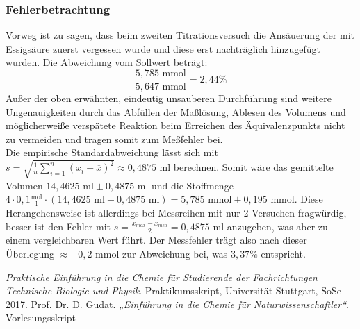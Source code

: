 \documentclass{scrartcl}
\begin{document}
\subsubsection{Fehlerbetrachtung}
Vorweg ist zu sagen, dass beim zweiten Titrationsversuch die Ansäuerung der  mit Essigsäure zuerst vergessen wurde und diese erst nachträglich hinzugefügt wurden. Die Abweichung vom Sollwert beträgt: 
\begin{equation}
       	\frac{5,785\text{ mmol}}{5,647 \text{ mmol}} = 2,44 \%
\end{equation}
Außer der oben erwähnten, eindeutig unsauberen Durchführung sind weitere Ungenauigkeiten durch das Abfüllen der Maßlösung, Ablesen des Volumens und möglicherweiße verspätete Reaktion beim Erreichen des Äquivalenzpunkts nicht zu vermeiden und tragen somit zum Meßfehler bei. \\
Die empirische Standardabweichung lässt sich mit $s = \sqrt{\frac{1}{n}\sum_{i=1}^n(x_i-\overline{x})^2} \approx 0,4875\text{ ml}$ berechnen. Somit wäre das gemittelte Volumen $14,4625\text{ ml} \pm 0,4875 \text{ ml}$ und die Stoffmenge $4\cdot 0,1\frac{\text{mol}}{\text{l}}\cdot (14,4625 \text{ ml}\pm 0,4875\text{ ml})=5,785 \text{ mmol}\pm 0,195 \text{ mmol}$. Diese Herangehensweise ist allerdings bei Messreihen mit nur 2 Versuchen fragwürdig, besser ist den Fehler mit $s = \frac{x_{max}-x_{min}}{2} = 0,4875 \text{ ml}$ anzugeben, was aber zu einem vergleichbaren Wert führt. Der Messfehler trägt also nach dieser Überlegung $\approx\pm 0,2$ mmol zur Abweichung bei, was $3,37 \% $ entspricht. 

\begin{thebibliography}{9}
		\emph{Praktische Einführung in die Chemie
für Studierende der Fachrichtungen
Technische Biologie und Physik}. Praktikumsskript, Universität Stuttgart,
SoSe 2017.  
	Prof. Dr. D. Gudat. \emph{„Einführung in die Chemie für Naturwissenschaftler“}. Vorlesungsskript
\end{thebibliography}
\end{document}
